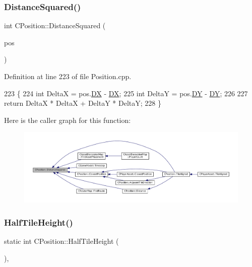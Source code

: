 \subsubsection{\texorpdfstring{Distance\+Squared()}{DistanceSquared()}}
{\footnotesize\ttfamily int C\+Position\+::\+Distance\+Squared (\begin{DoxyParamCaption}\item[{const \hyperlink{classCPosition}{C\+Position} \&}]{pos }\end{DoxyParamCaption})}



Definition at line 223 of file Position.\+cpp.


\begin{DoxyCode}
223                                                   \{
224     \textcolor{keywordtype}{int} DeltaX = pos.\hyperlink{classCPosition_a28445f9b872169715919074d82044eda}{DX} - \hyperlink{classCPosition_a28445f9b872169715919074d82044eda}{DX};
225     \textcolor{keywordtype}{int} DeltaY = pos.\hyperlink{classCPosition_a84139c9e8eb547e7cf3cb851739943a4}{DY} - \hyperlink{classCPosition_a84139c9e8eb547e7cf3cb851739943a4}{DY};
226     
227     \textcolor{keywordflow}{return} DeltaX * DeltaX + DeltaY * DeltaY;
228 \}
\end{DoxyCode}
Here is the caller graph for this function\+:
\nopagebreak
\begin{figure}[H]
\begin{center}
\leavevmode
\includegraphics[width=350pt]{classCPosition_acd96d507f44c0fdf13036ebc1a09e59c_icgraph}
\end{center}
\end{figure}
\hypertarget{classCPosition_a5e371060b1aa0d3d3c5df1e353e0e5fd}{}\label{classCPosition_a5e371060b1aa0d3d3c5df1e353e0e5fd} 
\subsubsection{\texorpdfstring{Half\+Tile\+Height()}{HalfTileHeight()}}
{\footnotesize\ttfamily static int C\+Position\+::\+Half\+Tile\+Height (\begin{DoxyParamCaption}{ }\end{DoxyParamCaption})\hspace{0.3cm}{\ttfamily [inline]}, {\ttfamily [static]}}



